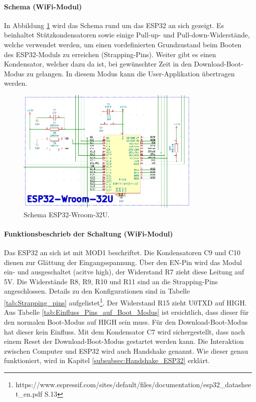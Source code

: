 \paragraph{Schema (WiFi-Modul)}\mbox{}

In Abbildung \ref{fig:Schema_ESP32} wird das Schema rund um das ESP32 an sich gezeigt. Es beinhaltet Stützkondensatoren sowie einige Pull-up- und Pull-down-Widerstände, welche verwendet werden, um einen vordefinierten Grundzustand beim Booten des ESP32-Moduls zu erreichen (Strapping-Pins). Weiter gibt es einen Kondensator, welcher dazu da ist, bei gewünschter Zeit in den Download-Boot-Modus zu gelangen. In diesem Modus kann die User-Applikation übertragen werden.

\begin{figure}[H]
	\centering
	\includegraphics[width=0.8\textwidth]{graphics/Schema_ESP32}
	\caption{Schema ESP32-Wroom-32U.}
	\label{fig:Schema_ESP32}
\end{figure}

\paragraph{Funktionsbeschrieb der Schaltung (WiFi-Modul)}\mbox{}

Das ESP32 an sich ist mit MOD1 beschriftet. Die Kondensatoren C9 und C10 dienen zur Glättung der Eingangsspannung. Über den EN-Pin wird das Modul ein- und ausgeschaltet (acitve high), der Widerstand R7 zieht diese Leitung auf 5V. Die Widerstände R8, R9, R10 und R11 sind an die Strapping-Pins angeschlossen.
Details zu den Konfigurationen sind in Tabelle \ref{tab:Strapping_pins} aufgelistet\footnote{https://www.espressif.com/sites/default/files/documentation/esp32\_datasheet\_en.pdf S.13}. Der Widerstand R15 zieht U0TXD auf HIGH. Aus Tabelle \ref{tab:Einfluss_Pins_auf_Boot_Modus} ist ersichtlich, dass dieser für den normalen Boot-Modus auf HIGH sein muss. Für den Download-Boot-Modus hat dieser kein Einfluss. Mit dem Kondensator C7 wird sichergestellt, dass nach einem Reset der Download-Boot-Modus gestartet werden kann. Die Interaktion zwischen Computer und ESP32 wird auch Handshake genannt. Wie dieser genau funktioniert, wird in Kapitel \ref{subsubsec:Handshake_ESP32} erklärt.

